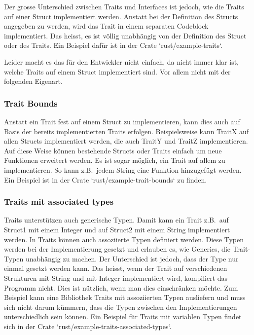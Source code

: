 \documentclass[letterpaper,12pt]{article}
\begin{document}
    Der grosse Unterschied zwischen Traits und Interfaces ist jedoch, wie die Traits auf einer Struct implementiert werden.
    Anstatt bei der Definition des Structs angegeben zu werden, wird das Trait in einem separaten Codeblock implementiert.
    Das heisst, es ist völlig unabhängig von der Definition des Struct oder des Traits.
    Ein Beispiel dafür ist in der Crate `rust/example-traits`.

    Leider macht es das für den Entwickler nicht einfach, da nicht immer klar ist, welche Traits auf einem Struct implementiert sind.
    Vor allem nicht mit der folgenden Eigenart.

    \subsubsection{Trait Bounds}\label{subsubsec:trait-bounds}
    Anstatt ein Trait fest auf einem Struct zu implementieren, kann dies auch auf Basis der bereits implementierten Traits erfolgen.
    Beispielsweise kann TraitX auf allen Structs implementiert werden, die auch TraitY und TraitZ implementieren.
    Auf diese Weise können bestehende Structs oder Traits einfach um neue Funktionen erweitert werden.
    Es ist sogar möglich, ein Trait auf allem zu implementieren.
    So kann z.B.\ jedem String eine Funktion hinzugefügt werden.
    Ein Beispiel ist in der Crate `rust/example-trait-bounds` zu finden.

    \subsubsection{Traits mit associated types}\label{subsubsec:traits-associated-types}
    Traits unterstützen auch generische Typen.
    Damit kann ein Trait z.B.\ auf Struct1 mit einem Integer und auf Struct2 mit einem String implementiert werden.
    In Traits können auch assoziierte Typen definiert werden.
    Diese Typen werden bei der Implementierung gesetzt und erlauben es, wie Generics, die Trait-Typen unabhängig zu machen.
    Der Unterschied ist jedoch, dass der Type nur einmal gesetzt werden kann.
    Das heisst, wenn der Trait auf verschiedenen Strukturen mit String und mit Integer implementiert wird, kompiliert das Programm nicht.
    Dies ist nützlich, wenn man dies einschränken möchte.
    Zum Beispiel kann eine Bibliothek Traits mit assoziierten Typen ausliefern und muss sich nicht darum kümmern,
        dass die Typen zwischen den Implementierungen unterschiedlich sein können.
    Ein Beispiel für Traits mit variablen Typen findet sich in der Crate `rust/example-traits-associated-types`.
\end{document}
